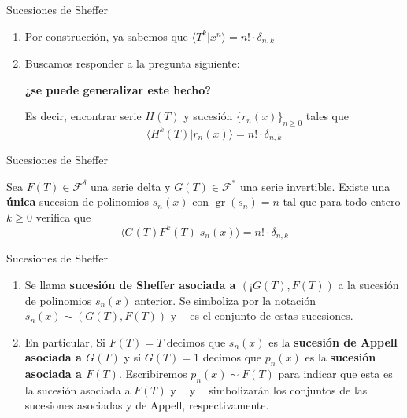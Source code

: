 \documentclass{beamer}
\newenvironment{teorema}[1][]{
  \begin{tcolorbox}[colback=darkred!10, colframe=darkred!90, title=Teorema\ #1, fonttitle=\bfseries]
}{
  \end{tcolorbox}
}
\newenvironment{definicion}[1][]{
  \begin{tcolorbox}[colback=red!10, colframe=red!80!black, title=Definición\ #1, fonttitle=\bfseries]
}{
  \end{tcolorbox}
}
\newcommand{\F}{\mathscr{F}} %
\DeclareMathOperator{\gr}{gr} %
\DeclareMathOperator*{\Sh}{Sh(\mathbb{P})} %
\DeclareMathOperator*{\App}{App(\mathbb{P})} %
\DeclareMathOperator*{\Umb}{Umb(\mathbb{P})} %
\begin{document}
  \begin{frame}{Sucesiones de Sheffer}
    \begin{enumerate}
      \item Por construcción, ya sabemos que $\langle T^k | x^n\rangle = n! \cdot \delta_{n,k}$
      \item Buscamos responder a la pregunta siguiente:\\
      \begin{center}
        \textbf{¿se puede generalizar este hecho?}
      \end{center}
      \begin{block}{}
        Es decir, encontrar serie $H(T)$ y sucesión $\{r_n(x)\}_{n \geq 0}$ tales que 
        \begin{equation*}
          \langle H^k(T) | r_n(x) \rangle = n! \cdot \delta_{n,k}
        \end{equation*}
      \end{block}
    \end{enumerate}
  \end{frame}

  \begin{frame}{Sucesiones de Sheffer}
    \begin{teorema}[(de existencia de las sucesiones de Sheffer)]
      Sea $F(T) \in \F^{\delta}$ una serie delta y $G(T) \in \F^*$ una serie invertible. Existe una \textbf{única} sucesion de polinomios $s_n(x)$ con $\gr(s_n) = n$ tal que para todo entero $k \geq 0$ verifica que
      \begin{equation*}
        \langle G(T)F^k(T)| s_n(x) \rangle = n! \cdot \delta_{n,k}
      \end{equation*}
    \end{teorema}
  \end{frame}

  \begin{frame}{Sucesiones de Sheffer}
    \begin{definicion}
      \begin{enumerate}
        \item Se llama \textbf{sucesión de Sheffer asociada a $(¡G(T), F(T))$} a la sucesión de polinomios $s_n(x)$ anterior. Se simboliza por la notación $s_n(x) \sim (G(T), F(T))$ y $\Sh$ es el conjunto de estas sucesiones. 
        \item En particular, Si $F(T) = T$ decimos que $s_n(x)$ es la \textbf{sucesión de Appell asociada a $G(T)$} y si $G(T) = 1$ decimos que $p_n(x)$ es la \textbf{sucesión asociada a $F(T)$}. Escribiremos $p_n(x) \sim F(T)$ para indicar que esta es la sucesión asociada a $F(T)$ y $\Umb$ y $\App$ simbolizarán los conjuntos de las sucesiones asociadas y de Appell, respectivamente.
      \end{enumerate}
    \end{definicion}
  \end{frame}
\end{document}
